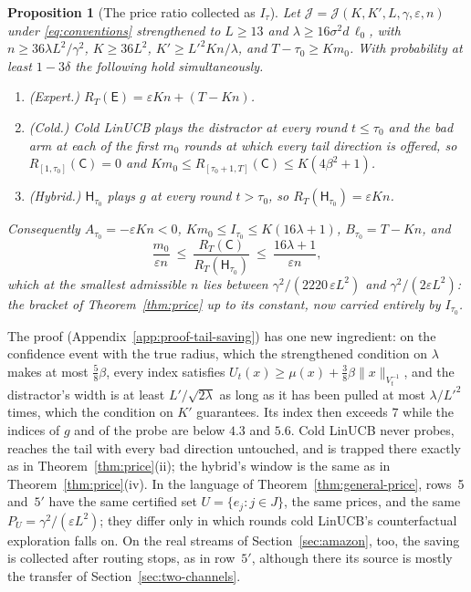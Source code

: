 \documentclass{article}
\newtheorem{proposition}{Proposition}
\theoremstyle{definition}
\theoremstyle{remark}
\newcommand{\eps}{\varepsilon}
\theoremstyle{remark}
\newcommand{\Cold}{\mathsf{C}}
\newcommand{\Exp}{\mathsf{E}}
\newcommand{\Hyb}{\mathsf{H}}
\begin{document}
\begin{proposition}[The price ratio collected as $I_\tau$]
\label{prop:cat-tail-saving}
Let $\mathcal J=\mathcal J(K,K',L,\gamma,\eps,n)$ under \eqref{eq:conventions}
strengthened to $L\ge13$ and $\lambda\ge16\sigma^2d\,\ell_0$, with
$n\ge36\lambda L^2/\gamma^2$, $K\ge36L^2$, $K'\ge L'^2Kn/\lambda$, and
$T-\tau_0\ge Km_0$. With probability at least $1-3\delta$ the following hold
simultaneously.
\begin{enumerate}[itemsep=1pt,topsep=1pt,leftmargin=*]
\item[(i)] \emph{(Expert.)} $R_T(\Exp)=\eps Kn+(T-Kn)$.
\item[(ii)] \emph{(Cold.)} Cold LinUCB plays the distractor at every round
$t\le\tau_0$ and the bad arm at each of the first $m_0$ rounds at which every
tail direction is offered, so $R_{[1,\tau_0]}(\Cold)=0$ and
$Km_0\le R_{[\tau_0+1,T]}(\Cold)\le K(4\beta^2+1)$.
\item[(iii)] \emph{(Hybrid.)} $\Hyb_{\tau_0}$ plays $g$ at every round
$t>\tau_0$, so $R_T(\Hyb_{\tau_0})=\eps Kn$.
\end{enumerate}
Consequently $A_{\tau_0}=-\eps Kn<0$, $Km_0\le I_{\tau_0}\le K(16\lambda+1)$,
$B_{\tau_0}=T-Kn$, and
\[
\frac{m_0}{\eps n}\ \le\ \frac{R_T(\Cold)}{R_T(\Hyb_{\tau_0})}\ \le\ \frac{16\lambda+1}{\eps n},
\]
which at the smallest admissible $n$ lies between $\gamma^2/(2220\,\eps L^2)$ and
$\gamma^2/(2\eps L^2)$: the bracket of Theorem~\ref{thm:price} up to its constant,
now carried entirely by $I_{\tau_0}$.
\end{proposition}

The proof (Appendix~\ref{app:proof-tail-saving}) has one new ingredient: on
the confidence event with the true radius, which the strengthened condition
on $\lambda$ makes at most $\tfrac58\beta$, every index satisfies
$U_t(x)\ge\mu(x)+\tfrac38\beta\|x\|_{V_t^{-1}}$, and the distractor's width is
at least $L'/\sqrt{2\lambda}$ as long as it has been pulled at most
$\lambda/L'^2$ times, which the condition on $K'$ guarantees. Its index then
exceeds $7$ while the indices of $g$ and of the probe are below $4.3$ and
$5.6$. Cold LinUCB never probes, reaches the tail with every bad direction
untouched, and is trapped there exactly as in Theorem~\ref{thm:price}(ii);
the hybrid's window is the same as in Theorem~\ref{thm:price}(iv). In the
language of Theorem~\ref{thm:general-price}, rows~5 and~$5'$ have the same
certified set $U=\{e_j:j\in J\}$, the same prices, and the same $P_U=\gamma^2/(\eps L^2)$;
they differ only in which rounds cold LinUCB's counterfactual exploration
falls on. On the real streams of Section~\ref{sec:amazon}, too, the saving
is collected after routing stops, as in row~$5'$, although there its source
is mostly the transfer of Section~\ref{sec:two-channels}.
\end{document}
